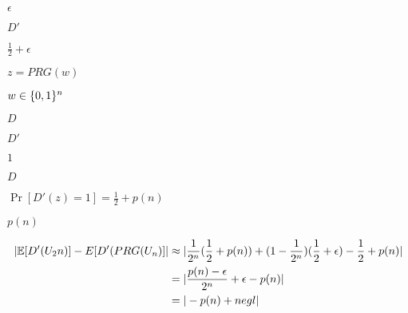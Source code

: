 \documentclass[10pt]{book}
\begin{document}
\begin{mdSnippets}
\begin{mdInlineSnippet}[92e4da341fe8f4cd46192f21b6ff3aa7]
$\epsilon$\end{mdInlineSnippet}%
\begin{mdInlineSnippet}[0232f27be40b2b647f260050dd308eb8]%
$D'$\end{mdInlineSnippet}%
\begin{mdInlineSnippet}[3fa002b563ba56f7533330c533977aef]%
$\frac{1}{2} + \epsilon$\end{mdInlineSnippet}%
\begin{mdInlineSnippet}[47c778d90cc44008e92c7e7fcc40cc51]%
$z = PRG(w)$\end{mdInlineSnippet}%
\begin{mdInlineSnippet}[3d82b817f50058751828b133814c8acd]%
$w \in \{0,1\}^n$\end{mdInlineSnippet}%
\begin{mdInlineSnippet}[f623e75af30e62bbd73d6df5b50bb7b5]%
$D$\end{mdInlineSnippet}%
\begin{mdInlineSnippet}[0232f27be40b2b647f260050dd308eb8]%
$D'$\end{mdInlineSnippet}%
\begin{mdInlineSnippet}[c4ca4238a0b923820dcc509a6f75849b]%
$1$\end{mdInlineSnippet}%
\begin{mdInlineSnippet}[f623e75af30e62bbd73d6df5b50bb7b5]%
$D$\end{mdInlineSnippet}%
\begin{mdInlineSnippet}[15d65114cd86e5a66fbc91cf88864700]%
$\Pr[D'(z) = 1] = \frac{1}{2} + p(n)$\end{mdInlineSnippet}%
\begin{mdInlineSnippet}%
$p(n)$\end{mdInlineSnippet}%
\begin{mdDisplaySnippet}%
\[%
\begin{aligned}
|\E[D'(U_2n)] - E[D'(PRG(U_n)]| &\approx |\frac{1}{2^n}(\frac{1}{2} + p(n)) + (1 - \frac{1}{2^n})(\frac{1}{2} + \epsilon) - \frac{1}{2} + p(n)| \\
&= |\frac{p(n) - \epsilon}{2^n} + \epsilon - p(n)| \\
&=|-p(n) + negl| \\

\end{aligned}\]
\end{mdDisplaySnippet}
\end{mdSnippets}
\end{document}
